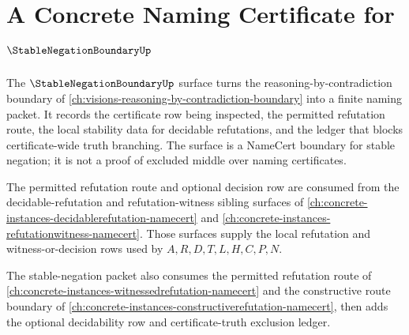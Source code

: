\chapter{A Concrete Naming Certificate for $\StableNegationBoundaryUp$}
\label{ch:concrete-instances-stable-negation-boundary-namecert}

The $\StableNegationBoundaryUp$ surface turns the reasoning-by-contradiction boundary of \autoref{ch:visions-reasoning-by-contradiction-boundary} into a finite naming packet. It records the certificate row being inspected, the permitted refutation route, the local stability data for decidable refutations, and the ledger that blocks certificate-wide truth branching. The surface is a NameCert boundary for stable negation; it is not a proof of excluded middle over naming certificates.

The permitted refutation route and optional decision row are consumed from the decidable-refutation and refutation-witness sibling surfaces of \autoref{ch:concrete-instances-decidablerefutation-namecert} and \autoref{ch:concrete-instances-refutationwitness-namecert}. Those surfaces supply the local refutation and witness-or-decision rows used by $A,R,D,T,L,H,C,P,N$.

The stable-negation packet also consumes the permitted refutation route of \autoref{ch:concrete-instances-witnessedrefutation-namecert} and the constructive route boundary of \autoref{ch:concrete-instances-constructiverefutation-namecert}, then adds the optional decidability row and certificate-truth exclusion ledger.

